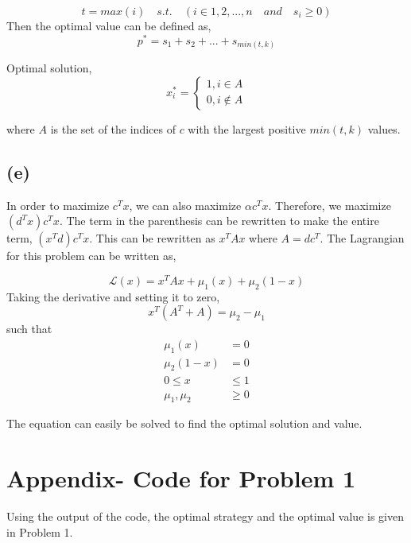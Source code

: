 \documentclass[]{report}
\begin{document}
\begin{equation}
	t = max(i) \quad s.t. \quad( i \in 1,2,...,n \quad and \quad s_i \geq 0)
\end{equation}
Then the optimal value can be defined as,
\[p^* = s_1 + s_2 + ... + s_{min(t,k)}\]

Optimal solution,
\[ x_i^* = \begin{cases} 
1, i \in A \\
0, i \notin A  
\end{cases}
\]

where $A$ is the set of the indices of $c$ with the largest positive $min(t,k)$ values.

\section*{(e)}

In order to maximize $c^Tx$, we can also maximize $\alpha c^Tx$. Therefore, we maximize $(d^Tx)c^Tx$. The term in the parenthesis can be rewritten to make the entire term, $(x^Td)c^Tx$. This can be rewritten as $x^TAx$ where $A = dc^T$. The Lagrangian for this problem can be written as,

\begin{equation}
	\mathcal{L}(x) = x^TAx + \mu_1(x) + \mu_2(1-x)
\end{equation}
Taking the derivative and setting it to zero,
\begin{equation}
	x^T(A^T + A) = \mu_2 - \mu_1
\end{equation}
such that
\begin{equation}
\begin{split}
\mu_1(x) &= 0 \\
\mu_2(1-x) &= 0 \\
0 \leq x &\leq 1 \\
\mu_1, \mu_2 &\geq 0
\end{split}
\end{equation}

The equation can easily be solved to find the optimal solution and value. 

\appendix
\chapter{Appendix- Code for Problem 1}

Using the output of the code, the optimal strategy and the optimal value is given in Problem 1.
\end{document}
